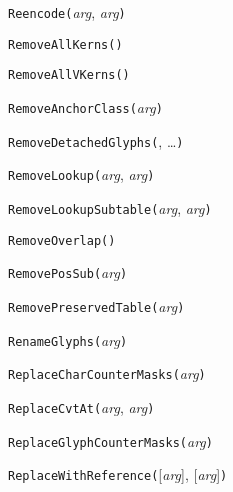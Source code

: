 
\noindent\texttt{Reencode(}\textit{arg}, \textit{arg}\texttt{)}


\noindent\texttt{RemoveAllKerns(}\texttt{)}


\noindent\texttt{RemoveAllVKerns(}\texttt{)}


\noindent\texttt{RemoveAnchorClass(}\textit{arg}\texttt{)}


\noindent\texttt{RemoveDetachedGlyphs(}, \ldots\texttt{)}


\noindent\texttt{RemoveLookup(}\textit{arg}, \textit{arg}\texttt{)}


\noindent\texttt{RemoveLookupSubtable(}\textit{arg}, \textit{arg}\texttt{)}


\noindent\texttt{RemoveOverlap(}\texttt{)}


\noindent\texttt{RemovePosSub(}\textit{arg}\texttt{)}


\noindent\texttt{RemovePreservedTable(}\textit{arg}\texttt{)}


\noindent\texttt{RenameGlyphs(}\textit{arg}\texttt{)}


\noindent\texttt{ReplaceCharCounterMasks(}\textit{arg}\texttt{)}


\noindent\texttt{ReplaceCvtAt(}\textit{arg}, \textit{arg}\texttt{)}


\noindent\texttt{ReplaceGlyphCounterMasks(}\textit{arg}\texttt{)}


\noindent\texttt{ReplaceWithReference(}[\textit{arg}], [\textit{arg}]\texttt{)}


